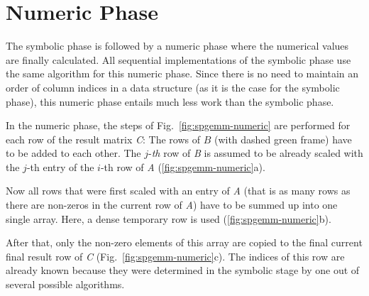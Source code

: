 \belowcaptionskip=-10pt



\section{Numeric Phase}
The symbolic phase is followed by a numeric phase where the numerical values are finally calculated. All sequential implementations of the symbolic phase use the same algorithm for this numeric phase. Since there is no need to maintain an order of column indices in a data structure (as it is the case for the symbolic phase), this numeric phase entails much less work than the symbolic phase.

In the numeric phase, the steps of Fig.~\ref{fig:spgemm-numeric} are performed for each row of the result matrix \textit{C}: The rows of $B$ (with dashed green frame) have to be added to each other. The $j$-\textit{th} row of \textit{B} is assumed to be already scaled with the $j$-th entry of the $i$-th row of \textit{A} (\ref{fig:spgemm-numeric}a).

Now all rows that were first scaled with an entry of \textit{A} (that is as many rows as there are non-zeros in the current row of \textit{A}) have to be summed up into one single array. Here, a dense temporary row is used (\ref{fig:spgemm-numeric}b). 

After that, only the non-zero elements of this array are copied to the final current final result row of \textit{C} (Fig.~\ref{fig:spgemm-numeric}c). The indices of this row are already known because they were determined in the symbolic stage by one out of several possible algorithms.


